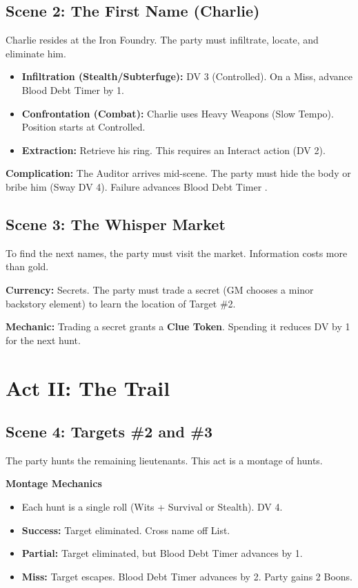 \documentclass[12pt]{book}
\begin{document}
\section{Scene 2: The First Name (Charlie)}

Charlie resides at the Iron Foundry. The party must infiltrate, locate, and eliminate him.

\begin{itemize}
    \item \textbf{Infiltration (Stealth/Subterfuge):} DV 3 (Controlled). On a Miss, advance Blood Debt Timer by 1.
    \item \textbf{Confrontation (Combat):} Charlie uses Heavy Weapons (Slow Tempo). Position starts at Controlled.
    \item \textbf{Extraction:} Retrieve his ring. This requires an Interact action (DV 2).
\end{itemize}

\textbf{Complication:} The Auditor arrives mid-scene. The party must hide the body or bribe him (Sway DV 4). Failure advances Blood Debt Timer .

\section{Scene 3: The Whisper Market}

To find the next names, the party must visit the market. Information costs more than gold.

\textbf{Currency:} Secrets. The party must trade a secret (GM chooses a minor backstory element) to learn the location of Target \#2.

\textbf{Mechanic:} Trading a secret grants a \textbf{Clue Token}. Spending it reduces DV by 1 for the next hunt.

\chapter{Act II: The Trail}

\section{Scene 4: Targets \#2 and \#3}

The party hunts the remaining lieutenants. This act is a montage of hunts.

\begin{infobox}
\textbf{Montage Mechanics}
\begin{itemize}
    \item Each hunt is a single roll (Wits + Survival or Stealth). DV 4.
    \item \textbf{Success:} Target eliminated. Cross name off List.
    \item \textbf{Partial:} Target eliminated, but Blood Debt Timer advances by 1.
    \item \textbf{Miss:} Target escapes. Blood Debt Timer advances by 2. Party gains 2 Boons.
\end{itemize}
\end{infobox}
\end{document}
